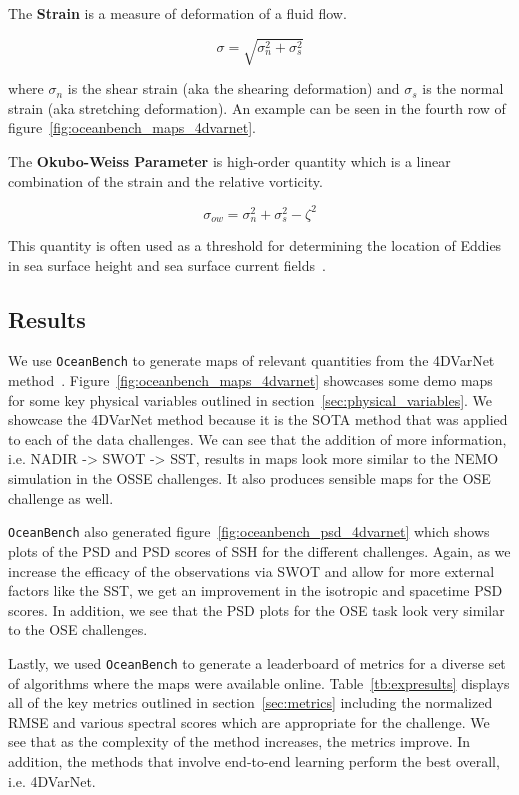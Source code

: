 The \textbf{Strain} is a measure of deformation of a fluid flow.

\begin{equation} \label{eq:strain}
    \sigma = \sqrt{\sigma_n^2 + \sigma_s^2}
\end{equation}

where $\sigma_n$ is the shear strain (aka the shearing deformation) and $\sigma_s$ is the normal strain (aka stretching deformation). An example can be seen in the fourth row of figure~\ref{fig:oceanbench_maps_4dvarnet}.

The \textbf{Okubo-Weiss Parameter} is high-order quantity which is a linear combination of the strain and the relative vorticity.

\begin{equation} \label{eq:okuboweiss}
    \sigma_{ow} = \sigma_n^2 + \sigma_s^2 - \zeta^2
\end{equation}

This quantity is often used as a threshold for determining the location of Eddies in sea surface height and sea surface current fields~\cite{OKUBO, WEISS, OKUBOWEISS}.
\subsection*{Results}

We use \texttt{OceanBench} to generate maps of relevant quantities from the 4DVarNet method~\cite{4DVARNETSWOT,4DVARNETSST}.
Figure~\ref{fig:oceanbench_maps_4dvarnet} showcases some demo maps for some key physical variables outlined in section~\ref{sec:physical_variables}.
We showcase the 4DVarNet method because it is the SOTA method that was applied to each of the data challenges.
We can see that the addition of more information, i.e. NADIR -> SWOT -> SST, results in maps look more similar to the NEMO simulation in the OSSE challenges.
It also produces sensible maps for the OSE challenge as well.

\texttt{OceanBench} also generated figure~\ref{fig:oceanbench_psd_4dvarnet} which shows plots of the PSD and PSD scores of SSH for the different challenges.
Again, as we increase the efficacy of the observations via SWOT and allow for more external factors like the SST, we get an improvement in the isotropic and spacetime PSD scores.
In addition, we see that the PSD plots for the OSE task look very similar to the OSE challenges. 

Lastly, we used \texttt{OceanBench} to generate a leaderboard of metrics for a diverse set of algorithms where the maps were available online.
Table~\ref{tb:expresults} displays all of the key metrics outlined in section~\ref{sec:metrics} including the normalized RMSE and various spectral scores which are appropriate for the challenge.
We see that as the complexity of the method increases, the metrics improve. 
In addition, the methods that involve end-to-end learning perform the best overall, i.e. 4DVarNet.

